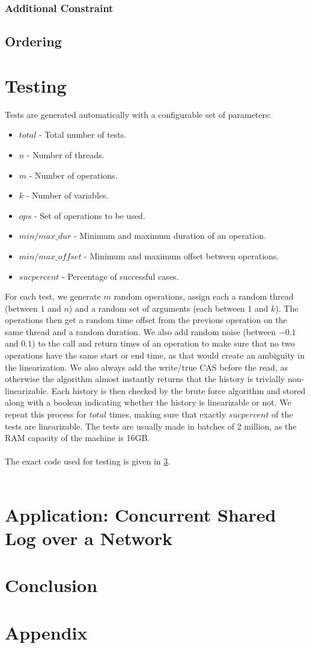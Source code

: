 \documentclass[oneside, a4paper, onecolumn, 10pt]{article}
\begin{document}
\subsubsection{Additional Constraint}
\subsection{Ordering}
\section{Testing}
Tests are generated automatically with a configurable set of parameters:
\begin{itemize}
  \item $total$ - Total number of tests.
  \item $n$ - Number of threads.
  \item $m$ - Number of operations.
  \item $k$ - Number of variables.
  \item $ops$ - Set of operations to be used.
  \item $min/max\_dur$ - Minimum and maximum duration of an operation.
  \item $min/max\_offset$ - Minimum and maximum offset between operations.
  \item $sucpercent$ - Percentage of successful cases.
\end{itemize}
For each test, we generate $m$ random operations, assign each a random thread (between $1$ and $n$) and a random set of arguments (each between $1$ and $k$). The operations then get a random time offset from the previous operation on the same thread and a random duration. We also add random noise (between $-0.1$ and $0.1$) to the call and return times of an operation to make sure that no two operations have the same start or end time, as that would create an ambiguity in the linearization. We also always add the write/true CAS before the read, as otherwise the algorithm almost instantly returns that the history is trivially non-linearizable. Each history is then checked by the brute force algorithm and stored along with a boolean indicating whether the history is linearizable or not. We repeat this process for $total$ times, making sure that exactly $sucpercent$ of the tests are linearizable. The tests are usually made in batches of 2 million, as the RAM capacity of the machine is 16GB.
\\\\
The exact code used for testing is given in \ref{}.
\\\\
\section{Application: Concurrent Shared Log over a Network}
\section{Conclusion}

\newpage


\newpage
\appendix

\section{Appendix}
\label{sec:appendix}
\end{document}
